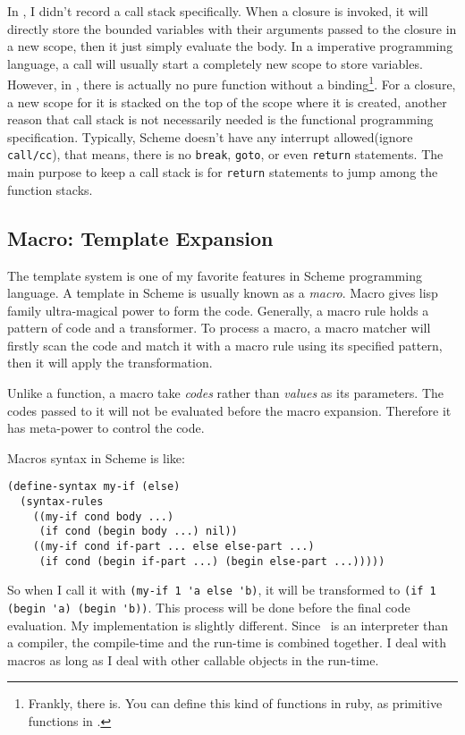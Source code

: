 In \revo, I didn't record a call stack specifically. When a closure is
invoked, it will directly store the bounded variables with their
arguments passed to the closure in a new scope, then it just simply
evaluate the body. In a imperative programming language, a call will
usually start a completely new scope to store variables. However, in
\revo, there is actually no pure function without a
binding\footnote{Frankly, there is. You can define this kind of
  functions in ruby, as primitive functions in \revo.}. For a closure,
a new scope for it is stacked on the top of the scope where it is
created, another reason that call stack is not necessarily needed is
the functional programming specification. Typically, Scheme doesn't
have any interrupt allowed(ignore \verb+call/cc+), that means, there
is no \verb+break+, \verb+goto+, or even \verb+return+ statements. The
main purpose to keep a call stack is for \verb+return+ statements to
jump among the function stacks.

\subsection{Macro: Template Expansion}
The template system is one of my favorite features in Scheme
programming language. A template in Scheme is usually known as a
\emph{macro}. Macro gives lisp family ultra-magical power to form the
code. Generally, a macro rule holds a pattern of code and a
transformer. To process a macro, a macro matcher will firstly scan the
code and match it with a macro rule using its specified pattern, then
it will apply the transformation.

Unlike a function, a macro take \emph{codes} rather than \emph{values}
as its parameters. The codes passed to it will not be evaluated before
the macro expansion. Therefore it has meta-power to control the code.

Macros syntax in Scheme is like:
\begin{verbatim}
(define-syntax my-if (else)
  (syntax-rules
    ((my-if cond body ...)
     (if cond (begin body ...) nil))
    ((my-if cond if-part ... else else-part ...)
     (if cond (begin if-part ...) (begin else-part ...)))))
\end{verbatim}

So when I call it with \verb+(my-if 1 'a else 'b)+, it will
be transformed to \verb+(if 1 (begin 'a) (begin 'b))+. This
process will be done before the final code evaluation. My
implementation is slightly different. Since \revo\ is an interpreter
than a compiler, the compile-time and the run-time is combined
together. I deal with macros as long as I deal with other callable
objects in the run-time.


